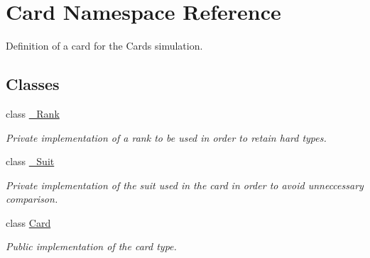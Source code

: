 \hypertarget{namespaceCard}{\section{Card Namespace Reference}
\label{namespaceCard}
}


Definition of a card for the Cards simulation.  


\subsection*{Classes}
\begin{DoxyCompactItemize}
\item 
class \hyperlink{classCard_1_1__Rank}{\-\_\-\-Rank}
\begin{DoxyCompactList}\small\item\em Private implementation of a rank to be used in order to retain hard types. \end{DoxyCompactList}\item 
class \hyperlink{classCard_1_1__Suit}{\-\_\-\-Suit}
\begin{DoxyCompactList}\small\item\em Private implementation of the suit used in the card in order to avoid unneccessary comparison. \end{DoxyCompactList}\item 
class \hyperlink{classCard_1_1Card}{Card}
\begin{DoxyCompactList}\small\item\em Public implementation of the card type. \end{DoxyCompactList}\end{DoxyCompactItemize}
